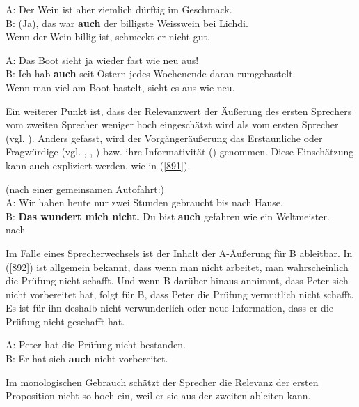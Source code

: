 {\begin{exe}
	\ex\label{889}
	A: Der Wein ist aber ziemlich dürftig im Geschmack.\\	 
	B: (Ja), das war \textbf{auch} der billigste Weisswein bei Lichdi.
	\newline
	\hbox{}\hfill\hbox {\citet[211]{Franck1980}}\\
	\glq Wenn der Wein billig ist, schmeckt er nicht gut.\grq {}
\end{exe}

\begin{exe}
	\ex\label{890}
	A: Das Boot sieht ja wieder fast wie neu aus!\\	 
	B: Ich hab \textbf{auch} seit Ostern jedes Wochenende daran rumgebastelt.
	\newline
	\hbox{}\hfill\hbox {\citet[211]{Franck1980}}\\
	\glq Wenn man viel am Boot bastelt, sieht es aus wie neu.\grq {}
\end{exe}
Ein weiterer Punkt ist, dass der Relevanzwert der Äußerung des ersten Sprechers vom zweiten Sprecher weniger hoch eingeschätzt wird als vom ersten Sprecher (vgl. \citealt[47-48]{Dahl1988}). Anders gefasst, wird der Vorgängeräußerung das Erstaunliche oder Fragwürdige (vgl. \citealt[211-212]{Franck1980}, \citealt[88]{Helbig1990}, \citealt[74]{Kwon2005}) bzw. ihre Informativität (\citealt[223-224]{Karagjosova2004}) genommen. Diese Einschätzung kann auch expliziert werden, wie in (\ref{891}).

\begin{exe}
	\ex\label{891}
	(nach einer gemeinsamen Autofahrt:)\\	 
	A: Wir haben heute nur zwei Stunden gebraucht bis nach Hause.\\
	B: \textbf{Das wundert mich nicht.} Du bist \textbf{auch} gefahren wie ein Weltmeister.
	\newline
	\hbox{}\hfill\hbox {nach \citet[101]{Burkhardt1982}}
\end{exe}	
Im Falle eines Sprecherwechsels ist der Inhalt der A-Äußerung für B ableitbar. In (\ref{892}) ist allgemein bekannt, dass wenn man nicht arbeitet, man wahrscheinlich die Prüfung nicht schafft. Und wenn B darüber hinaus annimmt, dass Peter sich nicht vorbereitet hat, folgt für B, dass Peter die Prüfung vermutlich nicht schafft. Es ist für ihn deshalb nicht verwunderlich oder neue Information, dass er die Prüfung nicht geschafft hat.

\begin{exe}
	\ex\label{892}
	A: Peter hat die Prüfung nicht bestanden.\\	 
	B: Er hat sich \textbf{auch} nicht vorbereitet.
\end{exe}
Im monologischen Gebrauch schätzt der Sprecher die Relevanz der ersten Proposition nicht so hoch ein, weil er sie aus der zweiten ableiten kann.

}
